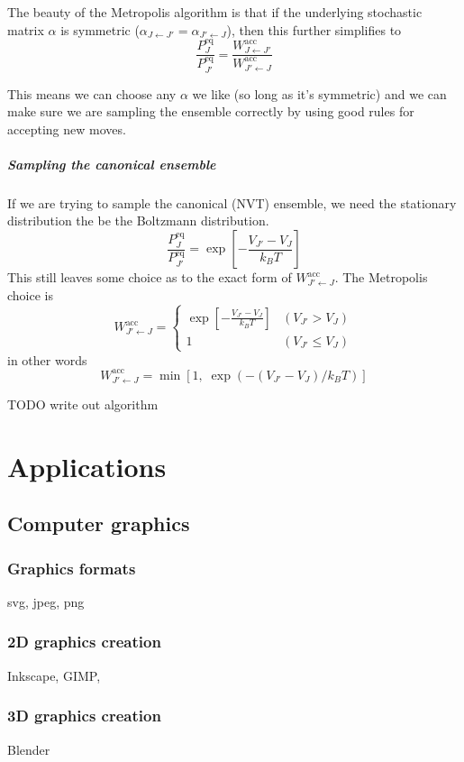 \documentclass{report}
\begin{document}
The beauty of the Metropolis algorithm is that if the underlying stochastic matrix $\alpha$ is symmetric ($\alpha_{J\leftarrow J'} = \alpha_{J'\leftarrow J}$), then this further simplifies to
\[ \frac{P^\text{eq}_J}{P^\text{eq}_{J'}} = \frac{W^\text{acc}_{J\leftarrow J'}}{W^\text{acc}_{J'\leftarrow J}} \]

This means we can choose any $\alpha$ we like (so long as it's symmetric) and we can make sure we are sampling the ensemble correctly by using good rules for accepting new moves.

\subsubsection{Sampling the canonical ensemble}
If we are trying to sample the canonical (NVT) ensemble, we need the stationary distribution the be the Boltzmann distribution.
\[ \frac{P^\text{eq}_J}{P^\text{eq}_{J'}} = \exp\left[- \frac{V_{J'}-V_J}{k_BT}\right] \]
This still leaves some choice as to the exact form of $W^\text{acc}_{J'\leftarrow J}$. The Metropolis choice is
\[ W^\text{acc}_{J'\leftarrow J} = \begin{cases}
\exp\left[- \frac{V_{J'}-V_J}{k_BT}\right] & (V_{J'}>V_J) \\
1 & (V_{J'}\leq V_J)
\end{cases} \]
in other words
\[ W^\text{acc}_{J'\leftarrow J} = \min \left[1, \; \exp\left(-(V_{J'}-V_J) / k_BT\right)\right] \]

TODO write out algorithm

\part{Applications}
\setcounter{chapter}{0} %
\chapter{Computer graphics}
\section{Graphics formats}
svg, jpeg, png
\section{2D graphics creation}
Inkscape, GIMP, 
\section{3D graphics creation}
Blender
\end{document}
